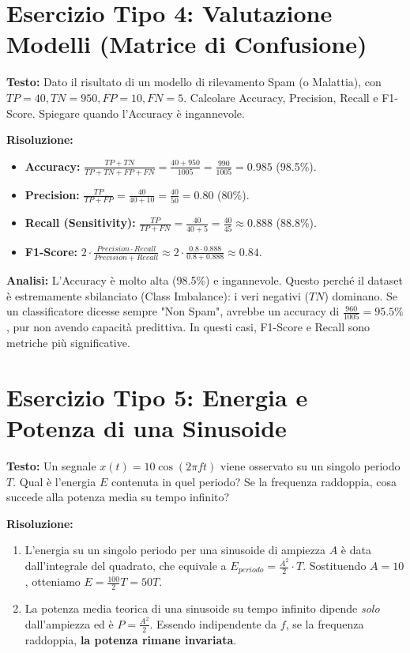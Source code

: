 \section{Esercizio Tipo 4: Valutazione Modelli (Matrice di Confusione)}
\textbf{Testo:} Dato il risultato di un modello di rilevamento Spam (o Malattia), con $TP = 40, TN = 950, FP = 10, FN = 5$.
Calcolare Accuracy, Precision, Recall e F1-Score.
Spiegare quando l'Accuracy è ingannevole.

\vspace{0.5cm}
\textbf{Risoluzione:}

\begin{itemize}
    \item \textbf{Accuracy:} $\frac{TP + TN}{TP + TN + FP + FN} = \frac{40 + 950}{1005} = \frac{990}{1005} = 0.985$ (98.5\%).
    \item \textbf{Precision:} $\frac{TP}{TP + FP} = \frac{40}{40 + 10} = \frac{40}{50} = 0.80$ (80\%).
    \item \textbf{Recall (Sensitivity):} $\frac{TP}{TP + FN} = \frac{40}{40 + 5} = \frac{40}{45} \approx 0.888$ (88.8\%).
    \item \textbf{F1-Score:} $2 \cdot \frac{Precision \cdot Recall}{Precision + Recall} \approx 2 \cdot \frac{0.8 \cdot 0.888}{0.8 + 0.888} \approx 0.84$.
\end{itemize}

\textbf{Analisi:} L'Accuracy è molto alta (98.5\%) e ingannevole.
Questo perché il dataset è estremamente sbilanciato (Class Imbalance): i veri negativi ($TN$) dominano.
Se un classificatore dicesse sempre "Non Spam", avrebbe un accuracy di $\frac{960}{1005} = 95.5\%$, pur non avendo capacità predittiva.
In questi casi, F1-Score e Recall sono metriche più significative.

\section{Esercizio Tipo 5: Energia e Potenza di una Sinusoide}
\textbf{Testo:} Un segnale $x(t) = 10 \cos(2\pi f t)$ viene osservato su un singolo periodo $T$.
Qual è l'energia $E$ contenuta in quel periodo?
Se la frequenza raddoppia, cosa succede alla potenza media su tempo infinito?

\vspace{0.5cm}
\textbf{Risoluzione:}
\begin{enumerate}
    \item L'energia su un singolo periodo per una sinusoide di ampiezza $A$ è data dall'integrale del quadrato, che equivale a $E_{periodo} = \frac{A^2}{2} \cdot T$. Sostituendo $A=10$, otteniamo $E = \frac{100}{2}T = 50 T$.
    \item La potenza media teorica di una sinusoide su tempo infinito dipende \textit{solo} dall'ampiezza ed è $P = \frac{A^2}{2}$.
    Essendo indipendente da $f$, se la frequenza raddoppia, \textbf{la potenza rimane invariata}.
\end{enumerate}

